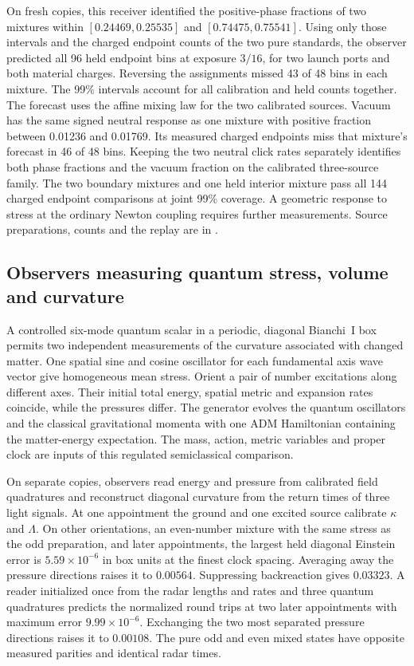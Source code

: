 \documentclass[11pt]{article}
\begin{document}
On fresh copies, this receiver identified the positive-phase fractions
of two mixtures within $[0.24469,0.25535]$ and $[0.74475,0.75541]$.
Using only those intervals and the charged endpoint counts of the two
pure standards, the observer predicted all 96 held endpoint bins at
exposure $3/16$, for two launch ports and both material charges.
Reversing the assignments missed 43 of 48 bins in each mixture.
The 99\% intervals account for all calibration and held counts together.
The forecast uses the affine mixing law for the two calibrated sources.
Vacuum has the same signed neutral response as one mixture with positive
fraction between 0.01236 and 0.01769. Its measured charged endpoints
miss that mixture's forecast in 46 of 48 bins. Keeping the two neutral
click rates separately identifies both phase fractions and the vacuum fraction
on the calibrated three-source family. The two boundary mixtures and one
held interior mixture pass all 144 charged endpoint comparisons at joint
99\% coverage. A geometric response to stress at the ordinary Newton
coupling requires further measurements. Source preparations,
counts and the replay are in
.

\subsection{Observers measuring quantum stress, volume and curvature}
\label{sec:quantum-small-ball-measurement}

A controlled six-mode quantum scalar in a periodic, diagonal Bianchi~I
box permits two independent measurements of the curvature associated with
changed matter. One spatial sine and cosine oscillator for each fundamental
axis wave vector give homogeneous mean stress. Orient a pair of number
excitations along different axes. Their initial total energy, spatial
metric and expansion rates coincide, while the pressures differ. The
generator evolves the quantum oscillators and the classical gravitational
momenta with one ADM Hamiltonian containing the matter-energy expectation.
The mass, action, metric variables and proper clock are inputs of this
regulated semiclassical comparison.

On separate copies, observers read energy and pressure from calibrated
field quadratures and reconstruct diagonal curvature from the return
times of three light signals. At one appointment the ground and one
excited source calibrate $\kappa$ and $\Lambda$. On other orientations,
an even-number mixture with the same stress as the odd preparation, and
later appointments, the largest held diagonal Einstein error is
$5.59\times10^{-6}$ in box units at the finest clock spacing.
Averaging away the pressure directions raises it to $0.00564$.
Suppressing backreaction gives $0.03323$. A reader initialized once
from the radar lengths and rates and three quantum quadratures predicts
the normalized round trips at two later appointments with maximum error
$9.99\times10^{-6}$. Exchanging the two most separated pressure
directions raises it to $0.00108$. The pure odd and even mixed states
have opposite measured parities and identical radar times.
\end{document}
